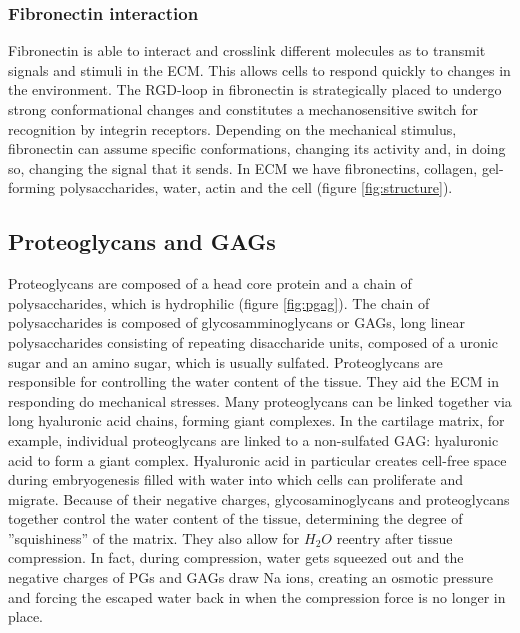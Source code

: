 		\subsubsection{Fibronectin interaction}
		Fibronectin is able to interact and crosslink different molecules as to transmit signals and stimuli in the ECM.
		This allows cells to respond quickly to changes in the environment.
		The RGD-loop in fibronectin is strategically placed to undergo strong conformational changes and constitutes a mechanosensitive switch for recognition by integrin receptors.
		Depending on the mechanical stimulus, fibronectin can assume specific conformations, changing its activity and, in doing so, changing the signal that it sends.
	In ECM we have fibronectins, collagen, gel-forming polysaccharides, water, actin and the cell (figure \ref{fig:structure}).

	\subsection{Proteoglycans and GAGs}
	Proteoglycans are composed of a head core protein and a chain of polysaccharides, which is hydrophilic (figure \ref{fig:pgag}).
	The chain of polysaccharides is composed of glycosamminoglycans or GAGs, long linear polysaccharides consisting of repeating disaccharide units, composed of a uronic sugar and an amino sugar, which is usually sulfated.
	Proteoglycans are responsible for controlling the water content of the tissue.
	They aid the ECM in responding do mechanical stresses.
	Many proteoglycans can be linked together via long hyaluronic acid chains, forming giant complexes.
	In the cartilage matrix, for example, individual proteoglycans are linked to a non-sulfated GAG: hyaluronic acid to form a giant complex.
	Hyaluronic acid in particular creates cell-free space during embryogenesis filled with water into which cells can proliferate and migrate.
	Because of their negative charges, glycosaminoglycans and proteoglycans together control the water content of the tissue, determining the degree of ”squishiness” of the matrix.
	They also allow for $H_2O$ reentry after tissue compression.
	In fact, during compression, water gets squeezed out and the negative charges of PGs and GAGs draw Na ions, creating an osmotic pressure and forcing the escaped water back in when the compression force is no longer in place.

